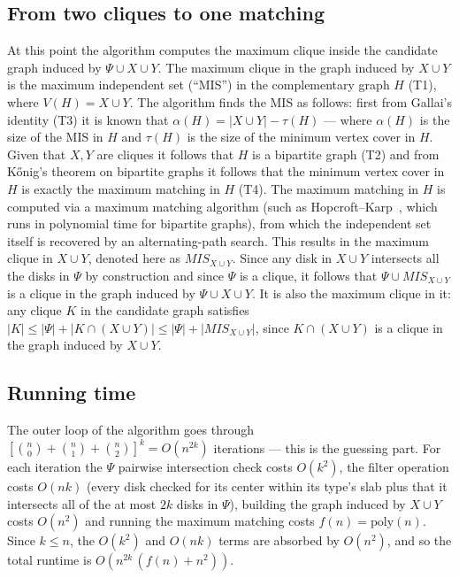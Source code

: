 \documentclass[12pt]{article}
\begin{document}
\subsection{From two cliques to one matching}\label{subsec:matching}
At this point the algorithm computes the maximum clique inside the candidate graph induced by $\Psi \cup X \cup Y$.
The maximum clique in the graph induced by $X \cup Y$ is the maximum independent set (``MIS'') in the complementary graph $H$ (T1), where $V(H) = X \cup Y$.
The algorithm finds the MIS as follows:
first from Gallai's identity (T3) it is known that $\alpha(H) = |X \cup Y| - \tau(H)$ ---
where $\alpha(H)$ is the size of the MIS in $H$ and $\tau(H)$ is the size of the minimum vertex cover in $H$.
Given that $X, Y$ are cliques it follows that $H$ is a bipartite graph (T2) and from K\H{o}nig's theorem on bipartite graphs it follows that the minimum vertex cover in $H$ is exactly the maximum matching in $H$ (T4).
The maximum matching in $H$ is computed via a maximum matching algorithm (such as Hopcroft--Karp~\cite{hopcroftkarp1973}, which runs in polynomial time for bipartite graphs), from which the independent set itself is recovered by an alternating-path search.
This results in the maximum clique in $X \cup Y$, denoted here as $MIS_{X \cup Y}$. Since any disk in $X \cup Y$ intersects all the disks in $\Psi$ by construction and since $\Psi$ is a clique, it follows that $\Psi \cup MIS_{X \cup Y}$ is a clique in the graph induced by $\Psi \cup X \cup Y$.
It is also the maximum clique in it: any clique $K$ in the candidate graph satisfies $|K| \leq |\Psi| + |K \cap (X \cup Y)| \leq |\Psi| + |MIS_{X \cup Y}|$, since $K \cap (X \cup Y)$ is a clique in the graph induced by $X \cup Y$.

\subsection{Running time}
The outer loop of the algorithm goes through $\left[\binom{n}{0}+\binom{n}{1}+\binom{n}{2}\right]^k = O(n^{2k})$ iterations --- this is the guessing part.
For each iteration the $\Psi$ pairwise intersection check costs $O(k^2)$, the filter operation costs $O(nk)$ (every disk checked for its center within its type's slab plus that it intersects all of the at most $2k$ disks in $\Psi$),
building the graph induced by $X \cup Y$ costs $O(n^2)$ and running the maximum matching costs $f(n) = \mathrm{poly}(n)$.
Since $k \leq n$, the $O(k^2)$ and $O(nk)$ terms are absorbed by $O(n^2)$, and so the total runtime is $O\!\left(n^{2k}\,(f(n) + n^2)\right)$.
\end{document}
